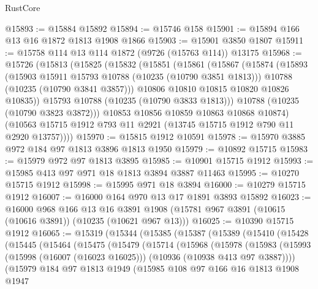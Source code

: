 \begin{lexlean}{RustCore}
\begin{coremodule}
@15893 := @15884 @15892
@15894 := @15746 @158
@15901 := @15894 @166 @13 @16 @1872 @1813 @1908 @1866
@15903 := @15901 @3850 @1807
@15911 := @15758 @114 @13 @114 @1872 (@9726 (@15763 @114)) @13175
@15968 := @15726
    (@15813
      (@15825
        (@15832
          (@15851
            (@15861
              (@15867
                (@15874
                  (@15893
                    (@15903 @15911 @15793 @10788 (@10235 (@10790 @3851 @1813)))
                    @10788
                    (@10235 (@10790 @3841 @3857)))
                  @10806
                  @10810
                  @10815
                  @10820
                  @10826
                  @10835))
              @15793
              @10788
              (@10235 (@10790 @3833 @1813)))
            @10788
            (@10235 (@10790 @3823 @3872)))
          @10853
          @10856
          @10859
          @10863
          @10868
          @10874)
        (@10563 @15715 @1912 @793 @11 @2921 (@13745 @15715 @1912 @790 @11 @2920 @13757))))
@15970 := @15815 @1912 @10591
@15978 := @15970 @3885 @972 @184 @97 @1813 @3896 @1813 @1950
@15979 := @10892 @15715
@15983 := @15979 @972 @97 @1813 @3895
@15985 := @10901 @15715 @1912
@15993 := @15985 @413 @97 @971 @18 @1813 @3894 @3887 @11463
@15995 := @10270 @15715 @1912
@15998 := @15995 @971 @18 @3894
@16000 := @10279 @15715 @1912
@16007 := @16000 @164 @970 @13 @17 @1891 @3893 @15892
@16023 := @16000
    @968
    @166
    @13
    @16
    @3891
    @1908
    (@15781 @967 @3891 (@10615 (@10616 @3891)) (@10235 (@10621 @967 @13)))
@16025 := @10390 @15715 @1912
@16065 := @15319
    (@15344
      (@15385
        (@15387
          (@15389
            (@15410
              (@15428
                (@15445
                  (@15464
                    (@15475
                      (@15479
                        (@15714
                          (@15968
                            (@15978
                              (@15983
                                (@15993
                                  (@15998 (@16007 (@16023 @16025)))
                                  (@10936 (@10938 @413 @97 @3887))))
                              (@15979
                                @184
                                @97
                                @1813
                                @1949
                                (@15985
                                  @108
                                  @97
                                  @166
                                  @16
                                  @1813
                                  @1908
                                  @1947

\end{coremodule}
\end{lexlean}
